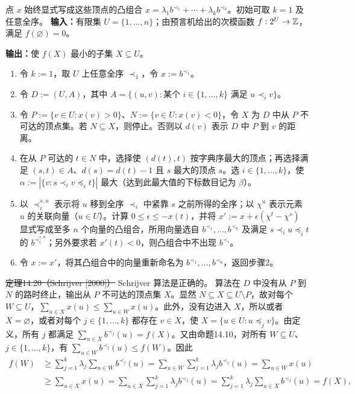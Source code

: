 点 $x$ 始终显式写成这些顶点的凸组合 $x=\lambda_1b^{\prec_1}+\cdots+\lambda_kb^{\prec_k}$。初始可取 $k=1$ 及任意全序。
\textbf{输入：}有限集 $U=\{1,\ldots,n\}$；由预言机给出的次模函数 $f:2^U\to\mathbb Z$，满足 $f(\varnothing)=0$。\par
\textbf{输出：}使 $f(X)$ 最小的子集 $X\subseteq U$。
\begin{enumerate}[label=\arabic*.]
\item 令 $k:=1$，取 $U$ 上任意全序 $\prec_1$，令 $x:=b^{\prec_1}$。
\item 令 $D:=(U,A)$，其中 $A=\{(u,v):\text{某个 }i\in\{1,\ldots,k\}\text{ 满足 }u\prec_i v\}$。
\item 令 $P:=\{v\in U:x(v)>0\}$、$N:=\{v\in U:x(v)<0\}$，令 $X$ 为 $D$ 中从 $P$ 不可达的顶点集。若 $N\subseteq X$，则停止。否则以 $d(v)$ 表示 $D$ 中 $P$ 到 $v$ 的距离。
\item 在从 $P$ 可达的 $t\in N$ 中，选择使 $(d(t),t)$ 按字典序最大的顶点；再选择满足 $(s,t)\in A$、$d(s)=d(t)-1$ 且 $s$ 最大的顶点 $s$。选 $i\in\{1,\ldots,k\}$，使 $\alpha:=|\{v:s\prec_i v\preceq_i t\}|$ 最大（达到此最大值的下标数目记为 $\beta$）。
\item 以 $\prec_i^{s,u}$ 表示将 $u$ 移到全序 $\prec_i$ 中紧靠 $s$ 之前所得的全序；以 $\chi^u$ 表示元素 $u$ 的关联向量（$u\in U$）。计算 $0\le\epsilon\le-x(t)$，并将 $x':=x+\epsilon(\chi^t-\chi^s)$ 显式写成至多 $n$ 个向量的凸组合，所用向量选自 $b^{\prec_1},\ldots,b^{\prec_k}$ 及满足 $s\prec_i u\preceq_i t$ 的 $b^{\prec_i^{s,u}}$；另外要求若 $x'(t)<0$，则凸组合中不出现 $b^{\prec_i}$。
\item 令 $x:=x'$，将其凸组合中的向量重新命名为 $b^{\prec_1},\ldots,b^{\prec_k}$，返回步骤2。
\end{enumerate}
\st{定理14.20（Schrijver [2000]）} Schrijver 算法是正确的。
\pr 算法在 $D$ 中没有从 $P$ 到 $N$ 的路时终止，输出从 $P$ 不可达的顶点集 $X$。显然 $N\subseteq X\subseteq U\setminus P$，故对每个 $W\subseteq U$，$\sum_{u\in X}x(u)\le\sum_{u\in W}x(u)$。此外，没有边进入 $X$，所以或者 $X=\varnothing$，或者对每个 $j\in\{1,\ldots,k\}$ 都存在 $v\in X$，使 $X=\{u\in U:u\preceq_jv\}$。由定义，所有 $j$ 都满足 $\sum_{u\in X}b^{\prec_j}(u)=f(X)$。又由命题14.10，对所有 $W\subseteq U$、$j\in\{1,\ldots,k\}$，有 $\sum_{u\in W}b^{\prec_j}(u)\le f(W)$。因此
\begin{align*}
f(W)&\ge\sum_{j=1}^k\lambda_j\sum_{u\in W}b^{\prec_j}(u)
=\sum_{u\in W}\sum_{j=1}^k\lambda_jb^{\prec_j}(u)=\sum_{u\in W}x(u)\\
&\ge\sum_{u\in X}x(u)=\sum_{u\in X}\sum_{j=1}^k\lambda_jb^{\prec_j}(u)
=\sum_{j=1}^k\lambda_j\sum_{u\in X}b^{\prec_j}(u)=f(X),
\end{align*}

